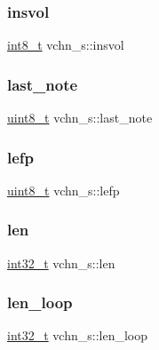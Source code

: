 \subsubsection{\texorpdfstring{insvol}{insvol}}
{\footnotesize\ttfamily \hyperlink{inttypes_8h_aef44329758059c91c76d334e8fc09700}{int8\+\_\+t} vchn\+\_\+s\+::insvol}

\mbox{\label{structvchn__s_ac4077127df43df8f7e9ec1e53e04a6c9}} 
\subsubsection{\texorpdfstring{last\+\_\+note}{last\_note}}
{\footnotesize\ttfamily \hyperlink{inttypes_8h_aba7bc1797add20fe3efdf37ced1182c5}{uint8\+\_\+t} vchn\+\_\+s\+::last\+\_\+note}

\mbox{\label{structvchn__s_a7fc39834e20f7641885b2812fc3eead3}} 
\subsubsection{\texorpdfstring{lefp}{lefp}}
{\footnotesize\ttfamily \hyperlink{inttypes_8h_aba7bc1797add20fe3efdf37ced1182c5}{uint8\+\_\+t} vchn\+\_\+s\+::lefp}

\mbox{\label{structvchn__s_a7c2d713330f7467f807c18d33a8879ec}} 
\subsubsection{\texorpdfstring{len}{len}}
{\footnotesize\ttfamily \hyperlink{inttypes_8h_a32f2e37ee053cf2ce8ca28d1f74630e5}{int32\+\_\+t} vchn\+\_\+s\+::len}

\mbox{\label{structvchn__s_ade9560c5eff8b25a29619b9754535ec5}} 
\subsubsection{\texorpdfstring{len\+\_\+loop}{len\_loop}}
{\footnotesize\ttfamily \hyperlink{inttypes_8h_a32f2e37ee053cf2ce8ca28d1f74630e5}{int32\+\_\+t} vchn\+\_\+s\+::len\+\_\+loop}

